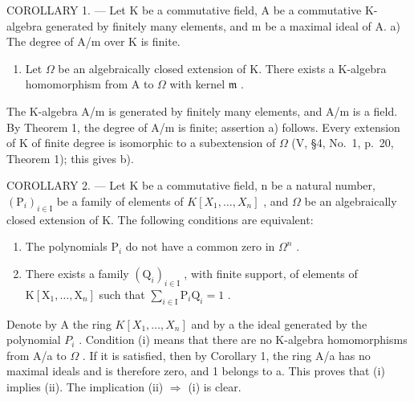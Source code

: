 COROLLARY 1. --- Let K be a commutative field, A be a commutative K-algebra generated by finitely many elements, and m be a maximal ideal of A. a) The degree of A/m over K is finite.

\begin{enumerate}
\def\labelenumi{\alph{enumi})}
\setcounter{enumi}{1}
\tightlist
\item
  Let \(\Omega\) be an algebraically closed extension of K. There exists a K-algebra homomorphism from A to \(\Omega\) with kernel \(\mathfrak{m}\) .
\end{enumerate}

The K-algebra A/m is generated by finitely many elements, and A/m is a field. By Theorem 1, the degree of A/m is finite; assertion a) follows. Every extension of K of finite degree is isomorphic to a subextension of \(\Omega\) (V, §4, No.~1, p.~20, Theorem 1); this gives b).

COROLLARY 2. --- Let K be a commutative field, n be a natural number, \((\mathrm{P}_{i})_{i\in\mathrm{I}}\) be a family of elements of \(K[X_{1},\ldots,X_{n}]\) , and \(\Omega\) be an algebraically closed extension of K. The following conditions are equivalent:

\begin{enumerate}
\def\labelenumi{(\roman{enumi})}
\item
  The polynomials \(\mathrm{P}_i\) do not have a common zero in \(\Omega^n\) .
\item
  There exists a family \((\mathrm{Q}_i)_{i\in \mathrm{I}}\) , with finite support, of elements of \(\mathrm{K}[\mathrm{X}_1,\dots ,\mathrm{X}_n]\) such that \(\sum_{i\in \mathrm{I}}\mathrm{P}_i\mathrm{Q}_i = 1\) .
\end{enumerate}

Denote by A the ring \(K[X_{1},\ldots,X_{n}]\) and by a the ideal generated by the polynomial \(P_{i}\) . Condition (i) means that there are no K-algebra homomorphisms from A/a to \(\Omega\) . If it is satisfied, then by Corollary 1, the ring A/a has no maximal ideals and is therefore zero, and 1 belongs to a. This proves that (i) implies (ii). The implication (ii) \(\Rightarrow\) (i) is clear.

